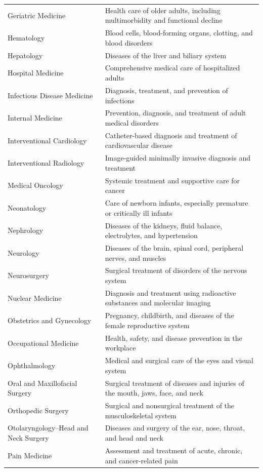 \begin{longtable}{>{\raggedright\arraybackslash}p{} >{\raggedright\arraybackslash}p{}}
Geriatric Medicine & Health care of older adults, including multimorbidity and functional decline \\
Hematology & Blood cells, blood-forming organs, clotting, and blood disorders \\
Hepatology & Diseases of the liver and biliary system \\
Hospital Medicine & Comprehensive medical care of hospitalized adults \\
Infectious Disease Medicine & Diagnosis, treatment, and prevention of infections \\
Internal Medicine & Prevention, diagnosis, and treatment of adult medical disorders \\
Interventional Cardiology & Catheter-based diagnosis and treatment of cardiovascular disease \\
Interventional Radiology & Image-guided minimally invasive diagnosis and treatment \\
Medical Oncology & Systemic treatment and supportive care for cancer \\
Neonatology & Care of newborn infants, especially premature or critically ill infants \\
Nephrology & Diseases of the kidneys, fluid balance, electrolytes, and hypertension \\
Neurology & Diseases of the brain, spinal cord, peripheral nerves, and muscles \\
Neurosurgery & Surgical treatment of disorders of the nervous system \\
Nuclear Medicine & Diagnosis and treatment using radioactive substances and molecular imaging \\
Obstetrics and Gynecology & Pregnancy, childbirth, and diseases of the female reproductive system \\
Occupational Medicine & Health, safety, and disease prevention in the workplace \\
Ophthalmology & Medical and surgical care of the eyes and visual system \\
Oral and Maxillofacial Surgery & Surgical treatment of diseases and injuries of the mouth, jaws, face, and neck \\
Orthopedic Surgery & Surgical and nonsurgical treatment of the musculoskeletal system \\
Otolaryngology--Head and Neck Surgery & Diseases and surgery of the ear, nose, throat, and head and neck \\
Pain Medicine & Assessment and treatment of acute, chronic, and cancer-related pain \\

\end{longtable}
